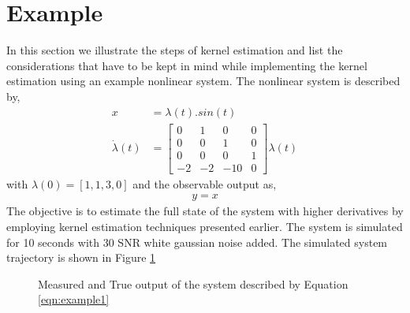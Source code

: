 \documentclass[letterpaper%
, twoside%
, 12pt%
,memoire%
, english%
,creativecommons,hyperref%
]{thETS}
\theoremstyle{newThmStyle}
\begin{document}
\section{Example}
In this section we illustrate the steps of kernel estimation and list the considerations that have to be kept in mind while implementing the kernel estimation using an example nonlinear system. The nonlinear system is described by, 
\begin{subequations} \label{eqn:example1}
\begin{align}
x &= \lambda(t) . sin(t)\\
\dot{\lambda}(t) &=  
\begin{bmatrix}
0  &  1  &   0   &  0  \\
0  &  0  &   1   &  0  \\
0  &  0  &   0   &  1  \\
-2 &  -2  &  -10 &  0  
\end{bmatrix} \lambda(t)
\end{align}
\end{subequations}
with $\lambda(0)=[1,1,3,0]$ and the observable output as, 
\begin{align*}
y = x
\end{align*}
The objective is to estimate the full state of the system with higher derivatives by employing kernel estimation techniques presented earlier. The system is simulated for 10 seconds with 30 SNR white gaussian noise added. The simulated system trajectory is shown in Figure \ref{Fig:outputs}
\begin{figure}[H]
	\centering
	\parbox{0.75\textwidth}{\caption{Measured and True output of the system described by Equation \eqref{eqn:example1}\label{Fig:outputs}}}
\end{figure}
\end{document}
